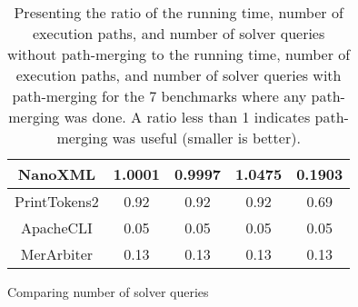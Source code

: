 \begin{table}
\begin{subtable}[t]{0.50\textwidth}
\begin{tabular}{ccccc}
                NanoXML                                                  & 1.0001                                                              & 0.9997                                                              & 1.0475                                                           & 0.1903                                                   \\ \hline
                PrintTokens2                                             & 0.92                                                                & 0.92                                                                & 0.92                                                             & 0.69                                                     \\ \hline
                ApacheCLI                                                & 0.05                                                                & 0.05                                                                & 0.05                                                             & 0.05                                                     \\ \hline
                MerArbiter                                               & 0.13                                                                & 0.13                                                                & 0.13                                                             & 0.13                                                     \\ \hline
            \end{tabular}
        \caption{Comparing number of solver queries}
        \label{table:numqueries-comparison}
    \end{subtable}

    \caption{Presenting the ratio of the running time, number of execution paths, and number of solver queries without
    path-merging to the running time, number of execution paths, and number of solver queries with path-merging
    for the 7 benchmarks where any path-merging was done. A ratio less than 1 indicates path-merging was useful (smaller is better).}
    \label{tab:table1}
\end{table}